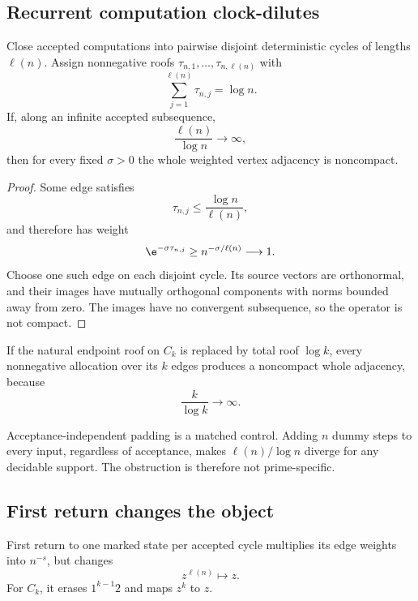 \subsection{Recurrent computation clock-dilutes}

\begin{theorem}
\label{thm:clock}
Close accepted computations into pairwise disjoint deterministic cycles of
lengths \(\ell(n)\).  Assign nonnegative roofs
\(\tau_{n,1},\ldots,\tau_{n,\ell(n)}\) with
\[
        \sum_{j=1}^{\ell(n)}\tau_{n,j}=\log n.
\]
If, along an infinite accepted subsequence,
\[
        \frac{\ell(n)}{\log n}\longrightarrow\infty,
\]
then for every fixed \(\sigma>0\) the whole weighted vertex adjacency is
noncompact.
\end{theorem}

\begin{proof}
Some edge satisfies
\[
        \tau_{n,j}\le\frac{\log n}{\ell(n)},
\]
and therefore has weight
\[
 \e^{-\sigma\tau_{n,j}}
 \ge n^{-\sigma/\ell(n)}
 \longrightarrow1.
\]
Choose one such edge on each disjoint cycle.  Its source vectors are
orthonormal, and their images have mutually orthogonal components with
norms bounded away from zero.  The images have no convergent subsequence,
so the operator is not compact.
\end{proof}

\begin{corollary}
\label{cor:spinedilution}
If the natural endpoint roof on \(C_k\) is replaced by total roof
\(\log k\), every nonnegative allocation over its \(k\) edges produces a
noncompact whole adjacency, because
\[
        \frac{k}{\log k}\longrightarrow\infty.
\]
\end{corollary}

Acceptance-independent padding is a matched control.  Adding \(n\) dummy
steps to every input, regardless of acceptance, makes
\(\ell(n)/\log n\) diverge for any decidable support.  The obstruction is
therefore not prime-specific.

\subsection{First return changes the object}

\begin{proposition}
\label{prop:inducing}
First return to one marked state per accepted cycle multiplies its edge
weights into \(n^{-s}\), but changes
\[
        z^{\ell(n)}\longmapsto z.
\]
For \(C_k\), it erases \(1^{k-1}2\) and maps \(z^k\) to \(z\).
\end{proposition}


